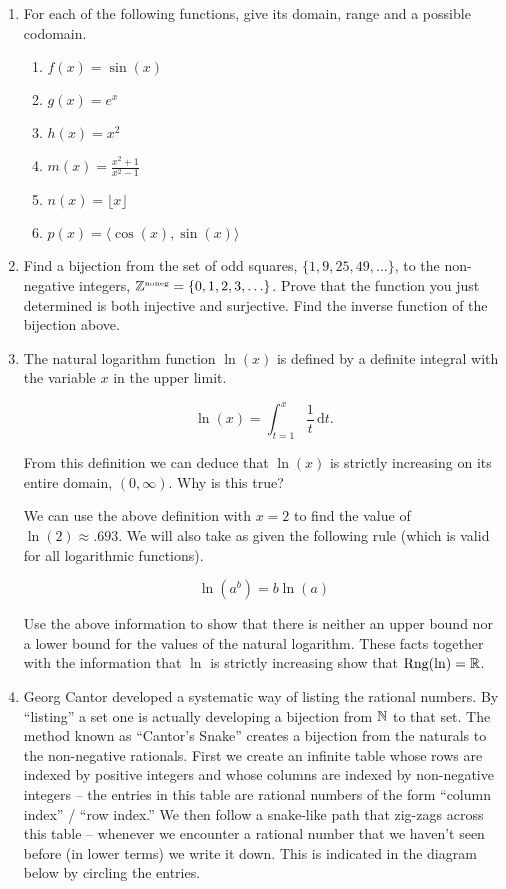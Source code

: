 
\begin{enumerate}

\item For each of the following functions, give its domain, range and a possible codomain.
  \begin{enumerate}
  \item $f(x) = \sin{(x)}$
  \item $g(x) = e^x$
  \item $h(x) = x^2$
  \item $m(x) = \frac{x^2+1}{x^2-1}$
  \item $n(x) = \lfloor x \rfloor$
  \item $p(x) = \langle \cos{(x)}, \sin{(x)} \rangle $
  \end{enumerate}

\item Find a bijection from the set of odd squares, $\{1, 9, 25, 49, \ldots\}$,
to the non-negative integers, ${\mathbb Z}^{\mbox{\tiny noneg}} = \{0,1,2,3, \ldots\}$.
Prove that the function you just determined is both injective and surjective.
Find the inverse function of the bijection above.

\item The natural logarithm function $\ln (x)$ is defined by a definite
integral with the variable $x$ in the upper limit.

\[ \ln (x) = \int_{t=1}^{x} \frac{1}{t} \, \mbox{d}t. \]

From this definition we can deduce that $\ln (x)$ is strictly increasing on its
entire domain, $(0, \infty)$.  Why is this true?

We can use the above definition with $x=2$ to find the value of 
$\ln (2) \approx .693$.  We will also take as given the following 
rule (which is valid for all logarithmic functions).

\[ \ln(a^b) = b \ln(a) \]

Use the above information to show that there is neither an upper bound 
nor a lower bound for the values of the natural logarithm.  These facts
together with the information that $\ln$ is strictly increasing show that
$\mbox{Rng}(\ln) = {\mathbb R}$.
 
\item Georg Cantor developed a systematic way of listing the rational numbers.
By ``listing'' a set one is actually developing a bijection from ${\mathbb N}$ to
that set.  The method known as ``Cantor's Snake'' creates a bijection from
the naturals to the non-negative rationals.  
First we create an infinite table whose rows
are indexed by positive integers and whose columns are indexed by non-negative
integers -- the entries in this table are rational numbers of the form
``column index'' / ``row index.''  We then follow a snake-like path that
zig-zags across this table -- whenever we encounter a rational number that 
we haven't seen before (in lower terms) we write it down.  This is indicated 
in the diagram below by circling the entries.   


\end{enumerate}
